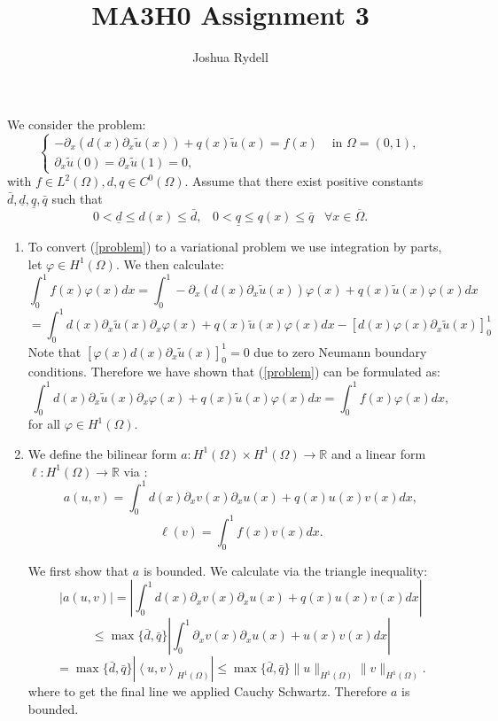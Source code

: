 \documentclass[a4paper,11pt]{article}
\title{MA3H0 Assignment 3}
\author{Joshua Rydell}
\theoremstyle{plain} %
\theoremstyle{definition} %
\theoremstyle{remark} %
\newcommand{\abs}[1]{\left | #1  \right | }
\newcommand{\qu}{\underline q}
\newcommand{\qo}{\bar{q}}
\newcommand{\du}{\underline d}
\newcommand{\ip}[2]{\left \langle #1 , #2 \right \rangle}
\newcommand{\dob}{\bar{d}}
\begin{document}
  
\maketitle
We consider the problem:
\begin{equation} \label{problem}
\begin{cases}
-\partial_x(d(x) \partial_x \tilde u(x)) + q(x) \tilde u(x) = f(x) & \text{ in } \Omega = (0,1), \\
\partial_x \tilde u(0) = \partial_x \tilde u(1) = 0,
\end{cases}
\end{equation}
with $f \in L^2
(\Omega), d, q \in C^0 (\Omega)$. Assume that there exist positive constants $ \dob, \du, \qu, \qo$
such that
\[ 0 < \du \leq d(x) \leq \dob, \; \; \; 0 < \qu \leq q(x) \leq \qo  \; \; \; \forall x \in \overline \Omega. \]
\begin{enumerate}
\item To convert (\ref{problem}) to a variational problem we use integration by parts, let $\varphi \in H^1(\Omega)$. We then calculate:
\[\int_0^1 f(x) \varphi(x) dx = \int_0^1 -\partial_x(d(x) \partial_x \tilde u(x)) \varphi(x) + q(x) \tilde u(x) \varphi(x) dx  \] 
\[=\int^1_0d(x)   \partial_x \tilde u(x)\partial_x \varphi(x)  + 
q(x) \tilde u(x) \varphi(x)dx - \left [d(x)\varphi(x)  \partial_x \tilde u(x) \right]^1_0\]
Note that $ \left [\varphi(x) d(x) \partial_x \tilde u(x) \right]^1_0 = 0$ due to zero Neumann boundary conditions. Therefore we have shown that (\ref{problem}) can be formulated as:
\[ \int^1_0  d(x)  \partial_x \tilde u(x)\partial_x \varphi(x) + q(x) \tilde u(x) \varphi(x)dx =  \int_0^1 f(x) \varphi(x) dx,\]
for all  $\varphi \in H^1(\Omega)$.

\item We define the bilinear form $a : H^1(\Omega) \times H^1(\Omega) \to \mathbb R$ and a linear form $\ell : H^1(\Omega) \to \mathbb R$ via :
\[a(u,v) = \int^1_0 d(x)\partial_x v(x)   \partial_x u(x) + q(x)  u(x) v(x)dx , \]
\[\ell(v) = \int_0^1 f(x) v(x) dx .\]

We first show that $a$ is bounded. We calculate via the triangle inequality:
\[ |a(u,v)| = \abs{\int^1_0 d(x)\partial_x v(x)   \partial_x u(x) + q(x)  u(x) v(x)dx} \]
\[\leq \max \{\dob, \qo\} \abs{\int^1_0 \partial_x v(x)   \partial_x u(x) + u(x) v(x)dx} \] 
\[=\max \{\dob, \qo\} \abs{\ip{u}{v}_{H^1(\Omega)}} \leq \max \{\dob, \qo\} \|u\|_{H^1(\Omega)}\|v\|_{H^1(\Omega)}. \]
where to get the final line we applied Cauchy Schwartz.
Therefore $a$ is bounded.


\end{enumerate}
\end{document}

